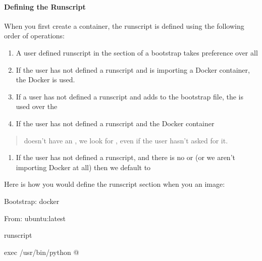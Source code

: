\documentclass[letterpaper,10pt,english]{sphinxmanual}
\begin{document}
\paragraph{Defining the Runscript}
\label{\detokenize{appendix:defining-the-runscript}}
When you first create a container, the runscript is defined using the
following order of operations:
\begin{enumerate}
\item {} 
A user defined runscript in the  section of a bootstrap takes
preference over all

\item {} 
If the user has not defined a runscript and is importing a Docker
container, the Docker  is used.

\item {} 
If a user has not defined a runscript and adds  to the bootstrap file,
the  is used over the 

\item {} 
If the user has not defined a runscript and the Docker container

\end{enumerate}
\begin{quote}

doesn’t have an , we look for , even if the user hasn’t asked for it.
\end{quote}
\begin{enumerate}
\item {} 
If the user has not defined a runscript, and there is no  or  (or we
aren’t importing Docker at all) then we default to 

\end{enumerate}

Here is how you would define the runscript section when you {\hyperref[\detokenize{build_a_container:build-a-container}]{}} an image:

%
\begin{sphinxVerbatim}[commandchars=\\\{\}]
Bootstrap: docker

From: ubuntu:latest


\PYGZpc{}runscript

exec /usr/bin/python \PYGZdq{}\PYGZdl{}@\PYGZdq{}
\end{sphinxVerbatim}
\end{document}
